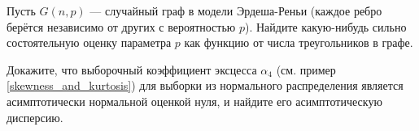 \begin{problem}
	Пусть $G(n, p)$ --- случайный граф в модели Эрдеша-Реньи (каждое ребро берётся независимо от других с вероятностью $p$). Найдите какую-нибудь сильно состоятельную оценку параметра $p$ как функцию от числа треугольников в графе. 
\end{problem}

\begin{problem}\label{asympt_var_of_kurtosis}
	Докажите, что выборочный коэффициент эксцесса $\alpha_4$ (см. пример \ref{skewness_and_kurtosis}) для выборки из нормального распределения является асимптотически нормальной оценкой нуля, и найдите его асимптотическую дисперсию.
\end{problem}




